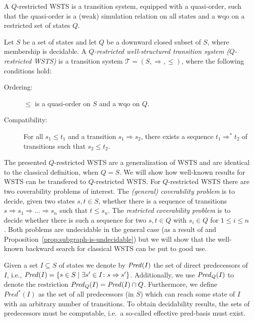 \documentclass{llncs}
\newcommand{\pred}[2][]{\ensuremath{\mathit{Pred}\ifthenelse{\equal{#1}{}}{}{_{#1}}(#2)}}
\newcommand{\predAll}[1]{\ensuremath{\mathit{Pred}^*(#1)}}
\begin{document}
A $Q$-restricted WSTS is a transition system, equipped with a quasi-order, such 
that the quasi-order is a (weak) simulation relation on all states and a wqo on 
a restricted set of states $Q$.

\begin{definition}
\label{def:wsts}
Let $S$ be a set of states and let $Q$ be a downward closed subset of
$S$, where membership is decidable.  A \emph{$Q$-restricted well-structured 
transition system ($Q$-restricted WSTS)} is a transition system $\mathcal{T} = 
(S, \Rightarrow, \leq)$, where the following conditions hold:

\noindent
\parbox{0.7\textwidth}{%
  \begin{description}
    \item[Ordering:] $\leq$ is a quasi-order on $S$ and a wqo on $Q$.
    \item[Compatibility:] For all $s_{1} \leq t_{1}$ and a transition $s_{1} 
    \Rightarrow s_{2}$, there exists a sequence $t_{1} \Rightarrow^* t_{2}$ of 
    transitions such that $s_{2} \leq t_{2}$.
  \end{description}
}%
\parbox{0.3\textwidth}{%
  \begin{center}%
  \end{center}%
}%
\end{definition}

The presented $Q$-restricted WSTS are a generalization of WSTS and are 
identical to the classical definition, when $Q = S$. We will show how 
well-known results for WSTS can be transfered to $Q$-restricted WSTS.
For $Q$-restricted WSTS there are two coverability problems of
interest. The \emph{(general) coverability problem} is to decide,
given two states $s,t \in S$, whether there is a sequence of
transitions $s \Rightarrow s_1 \Rightarrow \ldots \Rightarrow s_n$
such that $t \leq s_n$. The \emph{restricted coverability problem} is
to decide whether there is such a sequence for two $s,t \in Q$ with
$s_i \in Q$ for $1 \leq i \leq n$.  Both problems are undecidable in
the general case (as a result of \cite{bdkss:undecidability-gts} and
Proposition~\ref{prop:subgraph-is-undecidable}) but we will show that
the well-known backward search for classical WSTS can be put to good
use.

Given a set $I \subseteq S$ of states we denote by $\pred{I}$ the set
of direct predecessors of $I$, i.e., $\pred{I} = \{s \in S \mid
\exists s' \in I \colon s \Rightarrow s'\}$. Additionally, we use
$\pred[Q]{I}$ to denote the restriction $\pred[Q]{I} = \pred{I} \cap
Q$. Furthermore, we define $\predAll{I}$ as the set of all predecessors (in 
$S$) which can reach some state of $I$ with an arbitrary number of transitions. 
To obtain decidability results, the sets of predecessors must be computable,
i.e.~a so-called effective pred-basis must exist.
\end{document}
